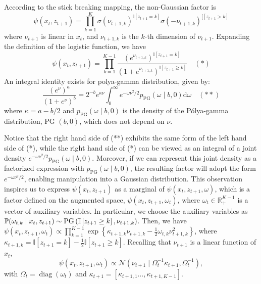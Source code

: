According to the stick breaking mapping, the non-Gaussian factor is
$$\psi\left(x_{t}, z_{t+1}\right)=\prod_{k=1}^{K} \sigma\left(\nu_{t+1, k}\right)^{\mathbb{I}\left[z_{t+1}=k\right]} \sigma\left(-\nu_{t+1, k}\right)^{\mathbb{[}\left[z_{t+1}>k\right]}$$ where  $\nu_{t+1}$ is linear in $x_{t}$, and $\nu_{t+1, k}$ is the $k$-th dimension of $\nu_{t+1}$.  Expanding the definition of the logistic function, we have
$$
\psi\left(x_{t}, z_{t+1}\right)=\prod_{k=1}^{K-1} \frac{\left(e^{\nu_{t+1, k}}\right)^{\mathbb{I}\left[z_{t+1}=k\right]}}{\left(1+e^{\nu_{t+1, k}}\right)^{\mathbb{I}\left[z_{t+1} \geq k\right]}} \quad (*)
$$
An integral identity exists for polya-gamma distribution, given by:
$$
\frac{\left(e^{\nu}\right)^{a}}{\left(1+e^{\nu}\right)^{b}}=2^{-b} e^{\kappa \nu} \int_{0}^{\infty} e^{-\omega \nu^{2} / 2} p_{\mathrm{PG}}(\omega \mid b, 0) \mathrm{d} \omega \quad(**)
$$
where $\kappa=a-b / 2$ and $p_{\mathrm{PG}}(\omega \mid b, 0)$ is the density of the Pólya-gamma distribution, PG $(b, 0)$, which does not depend on $\nu$.   

Notice that the right hand side of (**) exhibits the same form of the left hand side of (*), while the right hand side of (*) can be viewed as an integral of a joint density $e^{-\omega \nu^{2} / 2} p_{\mathrm{PG}}(\omega \mid b, 0)$. Moreover, if we can represent this joint density as a factorized expression with $p_{\mathrm{PG}}(\omega \mid b, 0)$, the resulting factor will adopt the form $e^{-\omega \nu^{2} / 2}$, enabling manipulation into a Gaussian distribution. This observation inspires us to 
express  $\psi\left(x_{t}, z_{t+1}\right)$ as a marginal of $\psi\left(x_{t}, z_{t+1}, \omega \right)$, which is a factor defined on the augmented space, $\psi\left(x_{t}, z_{t+1}, \omega_{t}\right)$, where $\omega_{t} \in \mathbb{R}_{+}^{K-1}$ is a vector of auxiliary variables. In particular, we choose the auxiliary variables as $\mathbb{P}(\omega_{t, k} \mid x_{t}, z_{t+1}) \sim \mathrm{PG}\left(\mathbb{I}\left[z_{t+1} \geq k\right], \nu_{t+1, k}\right)$. Then,  we have $\psi\left(x_{t}, z_{t+1}, \omega_{t}\right) \propto \prod_{k=1}^{K-1} \exp \left\{\kappa_{t+1, k} \nu_{t+1, k}-\frac{1}{2} \omega_{t, k} \nu_{t+1, k}^{2}\right\}$, where $\kappa_{t+1, k}=\mathbb{I}\left[z_{t+1}=k\right]-\frac{1}{2} \mathbb{I}\left[z_{t+1} \geq k\right]$. Recalling that $\nu_{t+1}$ is a linear function of $x_{t}$, 
$$
\psi\left(x_{t}, z_{t+1}, \omega_{t}\right) \propto \mathcal{N}\left(\nu_{t+1} \mid \Omega_{t}^{-1} \kappa_{t+1}, \Omega_{t}^{-1}\right),
$$
with $\Omega_{t}=\operatorname{diag}\left(\omega_{t}\right)$ and $\kappa_{t+1}=\left[\kappa_{t+1,1} \ldots, \kappa_{t+1, K-1}\right]$. 

